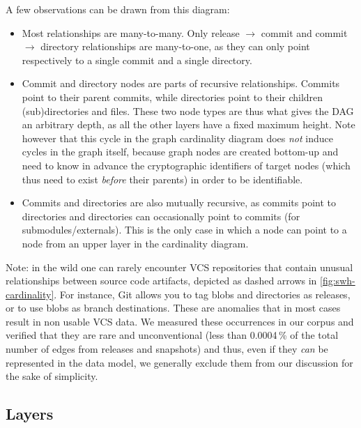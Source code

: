A few observations can be drawn from this diagram:

\begin{itemize}
    \item Most relationships are many-to-many. Only release $\to$ commit
        and commit $\to$ directory relationships are many-to-one, as
        they can only point respectively to a single commit and a single
        directory.

    \item Commit and directory nodes are parts of recursive relationships.
        Commits point to their parent commits, while directories point to their
        children (sub)directories and files. These two node types are thus what
        gives the DAG an arbitrary depth, as all the other layers have a fixed
        maximum height. Note however that this cycle in the graph cardinality
        diagram does \emph{not} induce cycles in the graph itself, because
        graph nodes are created bottom-up and need to know in advance the
        cryptographic identifiers of target nodes (which thus need to
        exist \emph{before} their parents) in order to be identifiable.

    \item Commits and directories are also mutually recursive, as commits point
        to directories and directories can occasionally point to commits (for
        submodules/externals). This is the only case in which a node can point
        to a node from an upper layer in the cardinality diagram.
\end{itemize}

Note: in the wild one can rarely encounter VCS repositories that contain
unusual relationships between source code artifacts, depicted as dashed arrows
in \cref{fig:swh-cardinality}.
For instance, Git allows you to tag blobs and directories as releases, or to
use blobs as branch destinations.
These are anomalies that in most cases result in non usable VCS data.  We
measured these occurrences in our corpus and verified that they are rare and
unconventional (less than 0.0004\,\% of the total number of edges from releases
and snapshots) and thus, even if they \emph{can} be represented in the \SWH{}
data model, we generally exclude them from our discussion for the sake of
simplicity.

\subsection{Layers}%
\label{sec:layers}

